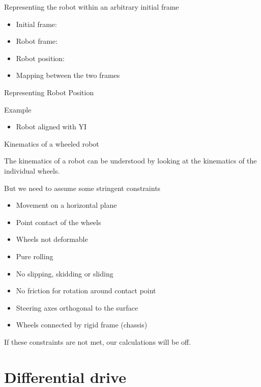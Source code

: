 \documentclass[compress]{beamer}
\begin{document}
\begin{frame}{}

Representing the robot within an arbitrary initial frame

\begin{itemize}
    \item Initial frame:
    \item Robot frame:
    \item Robot position:
    \item Mapping between the two frames
\end{itemize}

Representing Robot Position

\end{frame}

\begin{frame}{Example}

\begin{itemize}
    \item Robot aligned with YI
\end{itemize}

\end{frame}

\begin{frame}{Kinematics of a wheeled robot}

The kinematics of a robot can be understood by looking at the kinematics
of the individual wheels.

But we need to assume some stringent constraints

\begin{itemize}
    \item Movement on a horizontal plane
    \item Point contact of the wheels
    \item Wheels not deformable
    \item Pure rolling
    \item No slipping, skidding or sliding
    \item No friction for rotation around contact point
    \item Steering axes orthogonal to the surface
    \item Wheels connected by rigid frame (chassis)
\end{itemize}

If these constraints are not met, our calculations will be off.

\end{frame}

\section{Differential drive}
\end{document}
